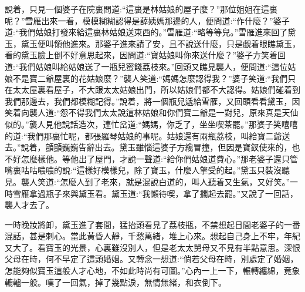 \begin{parag}
    說着，只見一個婆子在院裏問道:“這裏是林姑娘的屋子麼？”那位姐姐在這裏呢？”雪雁出來一看，模模糊糊認得是薛姨媽那邊的人，便問道:“作什麼？”婆子道:“我們姑娘打發來給這裏林姑娘送東西的。”雪雁道:“略等等兒。”雪雁進來回了黛玉，黛玉便叫領他進來。那婆子進來請了安，且不說送什麼，只是覷着眼瞧黛玉，看的黛玉臉上倒不好意思起來，因問道:“寶姑娘叫你來送什麼？”婆子方笑着回道:“我們姑娘叫給姑娘送了一瓶兒蜜餞荔枝來。”回頭又瞧見襲人，便問道:“這位姑娘不是寶二爺屋裏的花姑娘麼？”襲人笑道:“媽媽怎麼認得我？”婆子笑道:“我們只在太太屋裏看屋子，不大跟太太姑娘出門，所以姑娘們都不大認得。姑娘們碰着到我們那邊去，我們都模糊記得。”說着，將一個瓶兒遞給雪雁，又回頭看看黛玉，因笑着向襲人道:“怨不得我們太太說這林姑娘和你們寶二爺是一對兒，原來真是天仙似的。”襲人見他說話造次，連忙岔道:“媽媽，你乏了，坐坐喫茶罷。”那婆子笑嘻嘻的道:“我們那裏忙呢，都張羅琴姑娘的事呢。姑娘還有兩瓶荔枝，叫給寶二爺送去。”說着，顫顫巍巍告辭出去。黛玉雖惱這婆子方纔冒撞，但因是寶釵使來的，也不好怎麼樣他。等他出了屋門，才說一聲道:“給你們姑娘道費心。”那老婆子還只管嘴裏咕咕噥噥的說:“這樣好模樣兒，除了寶玉，什麼人擎受的起。”黛玉只裝沒聽見。襲人笑道:“怎麼人到了老來，就是混說白道的，叫人聽着又生氣，又好笑。”一時雪雁拿過瓶子來與黛玉看。黛玉道:“我懶待喫，拿了擱起去罷。”又說了一回話，襲人才去了。
\end{parag}


\begin{parag}
    一時晚妝將卸，黛玉進了套間，猛抬頭看見了荔枝瓶，不禁想起日間老婆子的一番混話，甚是刺心。當此黃昏人靜，千愁萬緒，堆上心來。想起自己身上不牢，年紀又大了。看寶玉的光景，心裏雖沒別人，但是老太太舅母又不見有半點意思。深恨父母在時，何不早定了這頭婚姻。又轉念一想道:“倘若父母在時，別處定了婚姻，怎能夠似寶玉這般人才心地，不如此時尚有可圖。”心內一上一下，輾轉纏綿，竟象轆轤一般。嘆了一回氣，掉了幾點淚，無情無緒，和衣倒下。
\end{parag}


